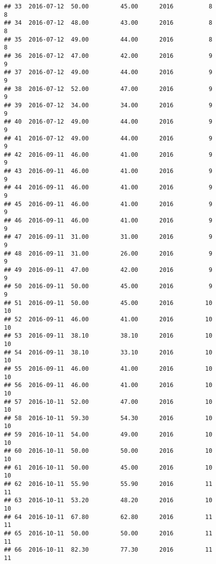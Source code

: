 \documentclass[]{article}
\begin{document}
\begin{verbatim}
## 33  2016-07-12  50.00         45.00      2016          8                 8
## 34  2016-07-12  48.00         43.00      2016          8                 8
## 35  2016-07-12  49.00         44.00      2016          8                 8
## 36  2016-07-12  47.00         42.00      2016          9                 9
## 37  2016-07-12  49.00         44.00      2016          9                 9
## 38  2016-07-12  52.00         47.00      2016          9                 9
## 39  2016-07-12  34.00         34.00      2016          9                 9
## 40  2016-07-12  49.00         44.00      2016          9                 9
## 41  2016-07-12  49.00         44.00      2016          9                 9
## 42  2016-09-11  46.00         41.00      2016          9                 9
## 43  2016-09-11  46.00         41.00      2016          9                 9
## 44  2016-09-11  46.00         41.00      2016          9                 9
## 45  2016-09-11  46.00         41.00      2016          9                 9
## 46  2016-09-11  46.00         41.00      2016          9                 9
## 47  2016-09-11  31.00         31.00      2016          9                 9
## 48  2016-09-11  31.00         26.00      2016          9                 9
## 49  2016-09-11  47.00         42.00      2016          9                 9
## 50  2016-09-11  50.00         45.00      2016          9                 9
## 51  2016-09-11  50.00         45.00      2016         10                10
## 52  2016-09-11  46.00         41.00      2016         10                10
## 53  2016-09-11  38.10         38.10      2016         10                10
## 54  2016-09-11  38.10         33.10      2016         10                10
## 55  2016-09-11  46.00         41.00      2016         10                10
## 56  2016-09-11  46.00         41.00      2016         10                10
## 57  2016-10-11  52.00         47.00      2016         10                10
## 58  2016-10-11  59.30         54.30      2016         10                10
## 59  2016-10-11  54.00         49.00      2016         10                10
## 60  2016-10-11  50.00         50.00      2016         10                10
## 61  2016-10-11  50.00         45.00      2016         10                10
## 62  2016-10-11  55.90         55.90      2016         11                11
## 63  2016-10-11  53.20         48.20      2016         10                10
## 64  2016-10-11  67.80         62.80      2016         11                11
## 65  2016-10-11  50.00         50.00      2016         11                11
## 66  2016-10-11  82.30         77.30      2016         11                11

\end{verbatim}
\end{document}
